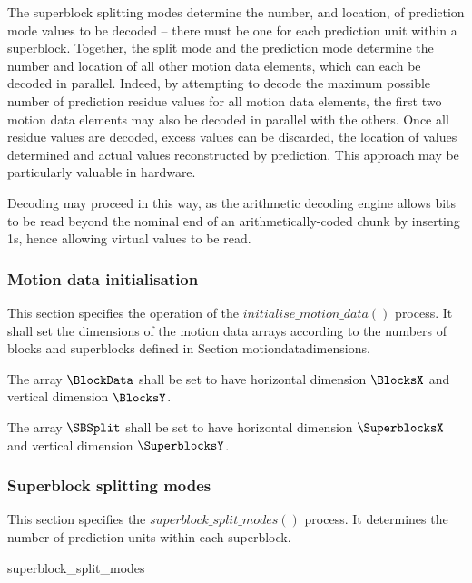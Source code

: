 \begin{informative}
The superblock splitting modes determine the number, and location, of prediction mode values to be decoded -- there
must be one for each prediction unit within a superblock. Together, the split mode and the prediction mode
determine the number and location of all other motion data elements, which can each be decoded in parallel. Indeed,
by attempting to decode the maximum possible number of prediction residue values for all motion data elements, the first 
two motion data elements may also be decoded in parallel with the others. Once all residue values are decoded, excess
values can be discarded, the location of values determined and actual values reconstructed by prediction. This approach
may be particularly valuable in hardware.

Decoding may proceed in this way, as the arithmetic decoding engine allows bits to be read beyond the nominal
end of an arithmetically-coded chunk by inserting 1s, hence allowing virtual values to be read.
\end{informative}

\subsubsection{Motion data initialisation}

\label{motioninit}

This section specifies the operation of the $initialise\_motion\_data()$ process.
 It shall set the dimensions of the motion data arrays according to the numbers
of blocks and superblocks defined in Section {motiondatadimensions}.

The array $\BlockData$ shall be set to have horizontal dimension $\BlocksX$ and 
vertical dimension $\BlocksY$.

The array $\SBSplit$ shall be set to have horizontal dimension $\SuperblocksX$ 
and vertical dimension $\SuperblocksY$.

\subsubsection{Superblock splitting modes}
\label{superblocksplit}

This section specifies the $superblock\_split\_modes()$ process. It determines the number of prediction units
within each superblock.

\begin{pseudo}{superblock\_split\_modes}{}
    \bsEND
\bsEND
{}
\end{pseudo}

